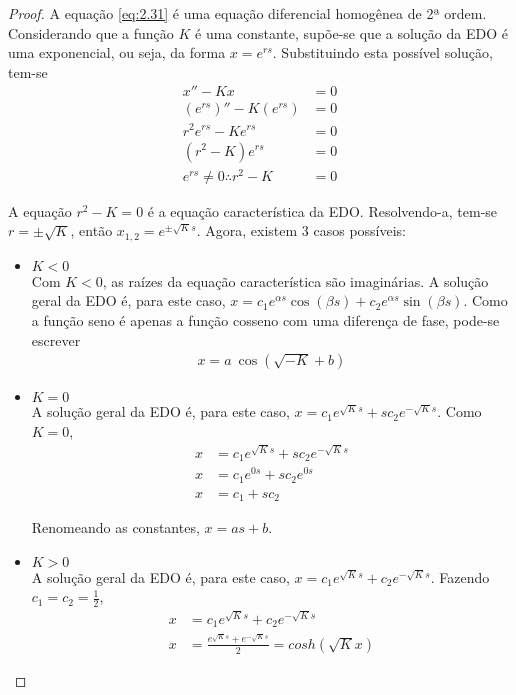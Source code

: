 \begin{proof}
	A equação \eqref{eq:2.31} é uma equação diferencial homogênea de 2ª ordem. Considerando que a função $K$ é uma constante, supõe-se que a solução da EDO é uma exponencial, 		ou seja, da forma $x=e^{rs}$. Substituindo esta possível solução, tem-se
	\begin{align*}
		x'' - Kx &=0\\
		(e^{rs})'' - K(e^{rs}) &= 0\\
		r^2e^{rs} - Ke^{rs}&=0\\
		(r^2 - K)e^{rs} &=0\\
		e^{rs} \neq 0 \therefore r^2 - K &= 0
	\end{align*}
	
	A equação $r^2 - K = 0$ é a equação característica da EDO. Resolvendo-a, tem-se $r = \pm \sqrt{K}$, então $x_{1,2} = e^{\pm\sqrt{K}s}$. Agora, existem 3 casos possíveis:
	\begin{itemize}
		\item $K<0$\\
			
		Com $K<0$, as raízes da equação característica são imaginárias. A solução geral da EDO é, para este caso, $x = c_1e^{\alpha s}\cos(\beta s) + c_2e^{\alpha s}\sin(\beta s)$. Como a função seno é apenas a função cosseno com uma diferença de fase, pode-se escrever
        \begin{align*}
        	x = a \ \cos(\sqrt{-K}+b)
        \end{align*}
			
		\item $K = 0$\\
		
		A solução geral da EDO é, para este caso, $x = c_1e^{\sqrt{K}s} + sc_2e^{-\sqrt{K}s}$. Como $K=0$, 
		\begin{align*}
            x &= c_1e^{\sqrt{K}s} + sc_2e^{-\sqrt{K}s}\\
            x &= c_1e^{0s} + sc_2e^{0s}\\
            x &= c_1 + sc_2
		\end{align*}
		
		Renomeando as constantes, $x = as + b$.

		\item $K > 0$\\
				
		A solução geral da EDO é, para este caso, $x = c_1e^{\sqrt{K}s} + c_2e^{-\sqrt{K}s}$. Fazendo $c_1=c_2=\frac{1}{2}$,
		\begin{align*}
            x &= c_1e^{\sqrt{K}s} + c_2e^{-\sqrt{K}s}\\
            x &= \frac{e^{\sqrt{K}s} + e^{-\sqrt{K}s}}{2} = cosh(\sqrt{K}x)
		\end{align*}
				

\end{itemize}
\end{proof}
